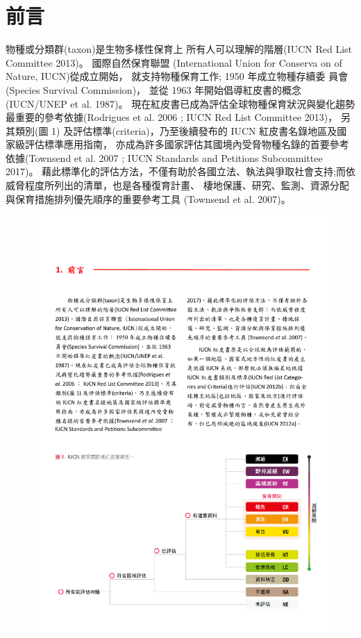 \chapter{前言}

\begin{multicols}{2}
物種或分類群(taxon)是生物多樣性保育上 所有人可以理解的階層(IUCN Red List Committee 2013)。
國際自然保育聯盟 (International Union for Conserva on of Nature, IUCN)從成立開始，
就支持物種保育工作; 1950 年成立物種存續委 員會(Species Survival Commission)，
並從 1963 年開始倡導紅皮書的概念(IUCN/UNEP et al. 1987)。
現在紅皮書已成為評估全球物種保育狀況與變化趨勢最重要的參考依據(Rodrigues et al. 2006 ; IUCN Red List Committee 2013)，
另其類別(圖 1) 及評估標準(criteria)，乃至後續發布的 IUCN 紅皮書名錄地區及國家級評估標準應用指南，
亦成為許多國家評估其國境內受脅物種名錄的首要參考依據(Townsend et al. 2007 ; IUCN Standards and Petitions Subcommittee 2017)。
藉此標準化的評估方法，不僅有助於各國立法、執法與爭取社會支持;而依威脅程度所列出的清單，也是各種復育計畫、
棲地保護、研究、監測、資源分配與保育措施排列優先順序的重要參考工具 (Townsend et al. 2007)。\\
\end{multicols}
\begin{figure}[!ht]
    \includegraphics[width=\textwidth]{fig1.pdf}
\end{figure}
